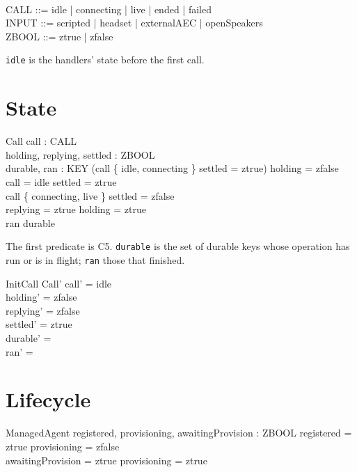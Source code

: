 \documentclass[a4paper,10pt,fleqn]{article}
\begin{document}
\begin{zed}
  [KEY] \\
  CALL ::= idle | connecting | live | ended | failed \\
  INPUT ::= scripted | headset | externalAEC | openSpeakers \\
  ZBOOL ::= ztrue | zfalse
\end{zed}

\texttt{idle} is the handlers' state before the first call.

\section{State}

\begin{schema}{Call}
  call : CALL \\
  holding, replying, settled : ZBOOL \\
  durable, ran : \power KEY
\where
  (call \in \{ idle, connecting \} \lor settled = ztrue) \implies holding = zfalse \\
  call = idle \implies settled = ztrue \\
  call \in \{ connecting, live \} \implies settled = zfalse \\
  replying = ztrue \implies holding = ztrue \\
  ran \subseteq durable
\end{schema}

The first predicate is C5. \texttt{durable} is the set of durable keys whose
operation has run or is in flight; \texttt{ran} those that finished.

\begin{schema}{InitCall}
  Call'
\where
  call' = idle \\
  holding' = zfalse \\
  replying' = zfalse \\
  settled' = ztrue \\
  durable' = \emptyset \\
  ran' = \emptyset
\end{schema}

\section{Lifecycle}

\begin{schema}{ManagedAgent}
  registered, provisioning, awaitingProvision : ZBOOL
\where
  registered = ztrue \implies provisioning = zfalse \\
  awaitingProvision = ztrue \implies provisioning = ztrue
\end{schema}
\end{document}
